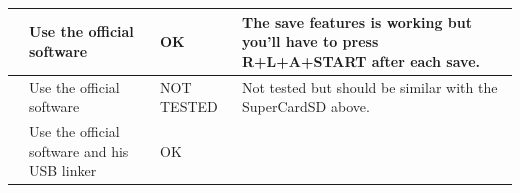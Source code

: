 \documentclass[12pt,a4paper]{article}
\begin{document}
    \begin{supertabular}{|p{3.5cm}|l|l|l|}
        \hline
            \begin{minipage}[c]{3cm}
            \vspace{0.5cm}
            \end{minipage} & 
            \begin{minipage}{3cm}
            Use the official software
            \end{minipage} &
            \begin{minipage}{2cm}
            \textcolor{vert}{OK}
            \end{minipage} &
            \begin{minipage}{7cm}
            The save features is working but you'll have to press R+L+A+START after each save.
            \end{minipage} \\
        \hline
            \begin{minipage}[c]{3cm}
            \vspace{0.5cm}
            \end{minipage} & 
            \begin{minipage}{3cm}
            Use the official software
            \end{minipage} &
            \begin{minipage}{2cm}
            \textcolor{bleu}{NOT TESTED}
            \end{minipage} &
            \begin{minipage}{7cm}
            Not tested but should be similar with the SuperCardSD above.
            \end{minipage} \\    
        \hline
            \begin{minipage}[c]{3cm}
            \vspace{0.5cm}
            \end{minipage} & 
            \begin{minipage}{3cm}
            Use the official software and his USB linker
            \end{minipage} &
            \begin{minipage}{2cm}
            \textcolor{vert}{OK}
            \end{minipage} &
            \begin{minipage}{7cm}

\end{minipage}
\end{supertabular}
\end{document}
